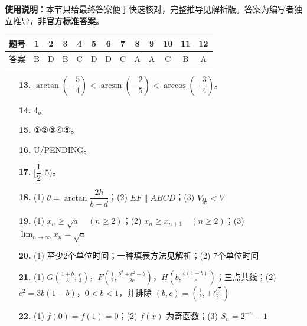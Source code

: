 
\begin{gknotice}
\textbf{使用说明}：本节只给最终答案便于快速核对，完整推导见解析版。答案为编写者独立推导，\textbf{非官方标准答案}。
\end{gknotice}

\begin{center}\begin{tabular}{ccccccccccccc}
\toprule
题号 & 1 & 2 & 3 & 4 & 5 & 6 & 7 & 8 & 9 & 10 & 11 & 12 \\
\midrule
答案 & B & D & B & C & D & D & C & A & A & C & B & A \\
\bottomrule
\end{tabular}\end{center}

\begin{itemize}[leftmargin=2.6em]
  \item[\textbf{13.}] \(\arctan(-\dfrac54)<\arcsin(-\dfrac25)<\arccos(-\dfrac34)\)。
  \item[\textbf{14.}] 4。
  \item[\textbf{15.}] ①②③④⑤。
  \item[\textbf{16.}] U/PENDING。
\end{itemize}

\begin{itemize}[leftmargin=2.6em]
  \item[\textbf{17.}] \([\dfrac12,5)\)。
  \item[\textbf{18.}] (1) \(\theta=\arctan\dfrac{2h}{b-d}\)；(2) \(EF\parallel ABCD\)；(3) \(V_{\text{估}}<V\)
  \item[\textbf{19.}] (1) \(x_n\geqslant\sqrt a\quad(n\geqslant2)\)；(2) \(x_n\geqslant x_{n+1}\quad(n\geqslant2)\)；(3) \(\displaystyle\lim_{n\to\infty}x_n=\sqrt a\)
  \item[\textbf{20.}] (1) 至少2个单位时间；一种填表方法见解析；(2) 7个单位时间
  \item[\textbf{21.}] (1) \(G(\frac{1+b}{3},\frac c3)\)，\(F(\frac12,\frac{b^2+c^2-b}{2c})\)，\(H(b,\frac{b(1-b)}c)\)；三点共线；(2) \(c^2=3b(1-b)\)，\(0<b<1\)，并排除 \((b,c)=(\frac12,\pm\frac{\sqrt3}{2})\)
  \item[\textbf{22.}] (1) \(f(0)=f(1)=0\)；(2) \(f(x)\) 为奇函数；(3) \(\displaystyle S_n=2^{-n}-1\)
\end{itemize}
